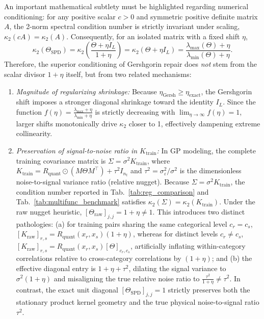 \documentclass[default,sn-mathphys,Numbered]{sn-jnl}
\theoremstyle{thmstyleone}
\theoremstyle{thmstylethree}
\theoremstyle{thmstyletwo}
\begin{document}
An important mathematical subtlety must be highlighted regarding numerical conditioning: for any positive scalar $c > 0$ and symmetric positive definite matrix $A$, the 2-norm spectral condition number is strictly invariant under scaling, $\kappa_2(c A) = \kappa_2(A)$. Consequently, for an isolated matrix with a fixed shift $\eta$,
\begin{equation}
\kappa_2(\Theta_{\mathrm{SPD}}) = \kappa_2\left(\frac{\Theta + \eta I_L}{1 + \eta}\right) = \kappa_2(\Theta + \eta I_L) = \frac{\lambda_{\max}(\Theta) + \eta}{\lambda_{\min}(\Theta) + \eta}.
\end{equation}
Therefore, the superior conditioning of Gershgorin repair does \textit{not} stem from the scalar divisor $1 + \eta$ itself, but from two related mechanisms:
\begin{enumerate}
    \item \textit{Magnitude of regularizing shrinkage:} Because $\eta_{\mathrm{Gersh}} \ge \eta_{\mathrm{exact}}$, the Gershgorin shift imposes a stronger diagonal shrinkage toward the identity $I_L$. Since the function $f(\eta) = \frac{\lambda_{\max} + \eta}{\lambda_{\min} + \eta}$ is strictly decreasing with $\lim_{\eta \to \infty} f(\eta) = 1$, larger shifts monotonically drive $\kappa_2$ closer to 1, effectively dampening extreme collinearity.
    \item \textit{Preservation of signal-to-noise ratio in $K_{\mathrm{train}}$:} In GP modeling, the complete training covariance matrix is $\Sigma = \sigma^2 K_{\mathrm{train}}$, where $K_{\mathrm{train}} = R_{\mathrm{quant}} \odot (M \Theta M^\top) + \tau^2 I_{n_t}$ and $\tau^2 = \sigma_\varepsilon^2 / \sigma^2$ is the dimensionless noise-to-signal variance ratio (relative nugget). Because $\Sigma = \sigma^2 K_{\mathrm{train}}$, the condition number reported in Tab.~\ref{tab:reg_comparison} and Tab.~\ref{tab:multifunc_benchmark} satisfies $\kappa_2(\Sigma) = \kappa_2(K_{\mathrm{train}}).$ Under the raw nugget heuristic, $[\Theta_{\mathrm{raw}}]_{j, j} = 1 + \eta \neq 1$. This introduces two distinct pathologies: (a) for training pairs sharing the same categorical level $c_r = c_s$, $[K_{\mathrm{raw}}]_{r, s} = R_{\mathrm{quant}}(x_r, x_s)(1+\eta)$, whereas for distinct levels $c_r \neq c_s$, $[K_{\mathrm{raw}}]_{r, s} = R_{\mathrm{quant}}(x_r, x_s)[\Theta]_{c_r, c_s}$, artificially inflating within-category correlations relative to cross-category correlations by $(1+\eta)$; and (b) the effective diagonal entry is $1 + \eta + \tau^2$, dilating the signal variance to $\sigma^2(1+\eta)$ and misaligning the true relative noise ratio to $\frac{\tau^2}{1+\eta} \neq \tau^2$. In contrast, the exact unit diagonal $[\Theta_{\mathrm{SPD}}]_{j, j} = 1$ strictly preserves both the stationary product kernel geometry and the true physical noise-to-signal ratio $\tau^2$.
\end{enumerate}
\end{document}
